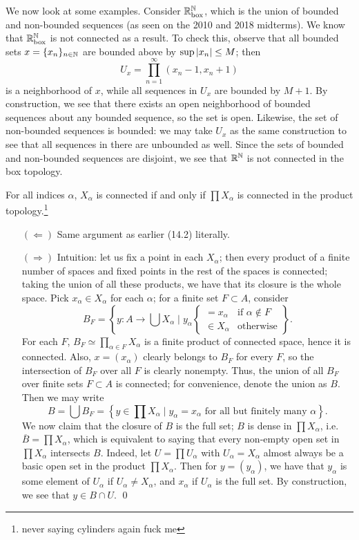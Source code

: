 \noindent We now look at some examples. Consider $\mathbb R_\mathrm{box}^\mathbb N$, which is the union of bounded and non-bounded sequences (as seen on the 2010 and 2018 midterms). We know that $\mathbb R_\mathrm{box}^\mathbb N$ is not connected as a result. To check this, observe that all bounded sets $x = \{x_n\}_{n \in \mathbb N}$ are bounded above by $\sup \left\lvert x_n \right\rvert \leq M$; then
\[ U_x = \prod_{n = 1}^\infty \left(x_n - 1, x_n + 1\right) \]
is a neighborhood of $x$, while all sequences in $U_x$ are bounded by $M + 1$. By construction, we see that there exists an open neighborhood of bounded sequences about any bounded sequence, so the set is open. Likewise, the set of non-bounded sequences is bounded: we may take $U_x$ as the same construction to see that all sequences in there are unbounded as well. Since the sets of bounded and non-bounded sequences are disjoint, we see that $\mathbb R^\mathbb N$ is not connected in the box topology.
\begin{simplethm}
    For all indices $\alpha$, $X_\alpha$ is connected if and only if $\prod X_\alpha$ is connected in the product topology.\footnote{never saying cylinders again fuck me}
\end{simplethm}
\begin{itemize}
    \item[$(\Leftarrow)$] Same argument as earlier (14.2) literally.
    \item[$(\Rightarrow)$] Intuition: let us fix a point in each $X_\alpha$; then every product of a finite number of spaces and fixed points in the rest of the spaces is connected; taking the union of all these products, we have that its closure is the whole space.
    \medskip\newline
    Pick $x_\alpha \in X_\alpha$ for each $\alpha$; for a finite set $F \subset A$, consider
    \[ B_F = \left\{ y : A \to \bigcup X_\alpha \mid y_\alpha \begin{cases} = x_\alpha & \text{if } \alpha \not\in F \\ \in X_\alpha & \text{otherwise} \end{cases} \right\}. \]
    For each $F$, $B_F \simeq \prod_{\alpha \in F} X_\alpha$ is a finite product of connected space, hence it is connected. Also, $x = (x_\alpha)$ clearly belongs to $B_F$ for every $F$, so the intersection of $B_F$ over all $F$ is clearly nonempty. Thus, the union of all $B_F$ over finite sets $F \subset A$ is connected; for convenience, denote the union as $B$. Then we may write
    \[ B = \bigcup B_F = \left\{ y \in \prod X_\alpha \mid y_\alpha = x_\alpha \text{ for all but finitely many } \alpha \right\}. \]
    We now claim that the closure of $B$ is the full set; $B$ is dense in $\prod X_\alpha$, i.e. $\overline{B} = \prod X_\alpha$, which is equivalent to saying that every non-empty open set in $\prod X_\alpha$ intersects $B$. Indeed, let $U = \prod U_\alpha$ with $U_\alpha = X_\alpha$ almost always be a basic open set in the product $\prod X_\alpha$. Then for $y = (y_\alpha)$, we have that $y_\alpha$ is some element of $U_\alpha$ if $U_\alpha \neq X_\alpha$, and $x_\alpha$ if $U_\alpha$ is the full set. By construction, we see that $y \in B \cap U$. \qed
\end{itemize}
